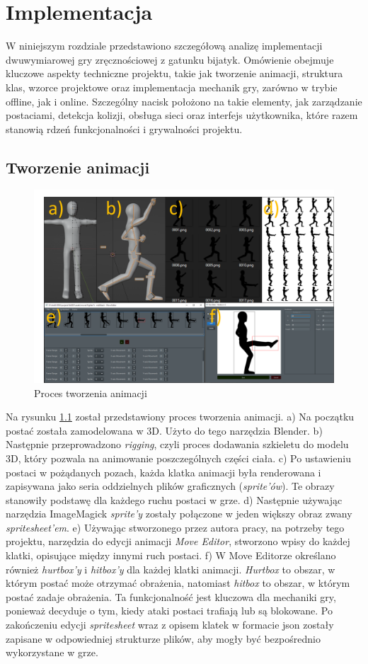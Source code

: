 \chapter{Implementacja}
W niniejszym rozdziale przedstawiono szczegółową analizę implementacji dwuwymiarowej gry zręcznościowej z gatunku bijatyk. Omówienie obejmuje kluczowe aspekty techniczne projektu, takie jak tworzenie animacji, struktura klas, wzorce projektowe oraz implementacja mechanik gry, zarówno w trybie offline, jak i online. Szczególny nacisk położono na takie elementy, jak zarządzanie postaciami, detekcja kolizji, obsługa sieci oraz interfejs użytkownika, które razem stanowią rdzeń funkcjonalności i grywalności projektu.
\section{Tworzenie animacji}
\begin{figure}
	\centering
		\includegraphics[width=0.64\linewidth]{rys03/animacja}
	\caption{Proces tworzenia animacji}
	\label{fig:animacja}
\end{figure}
Na rysunku \ref{fig:animacja} został przedstawiony proces tworzenia animacji. a) Na początku postać została zamodelowana w 3D. Użyto do tego narzędzia Blender. b) Następnie przeprowadzono \emph{rigging}, czyli proces dodawania szkieletu do modelu 3D, który pozwala na animowanie poszczególnych części ciała. c) Po ustawieniu postaci w pożądanych pozach, każda klatka animacji była renderowana i zapisywana jako seria oddzielnych plików graficznych (\emph{sprite'ów}). Te obrazy stanowiły podstawę dla każdego ruchu postaci w grze. d) Następnie używając narzędzia ImageMagick \emph{sprite'y} zostały połączone w jeden większy obraz zwany \emph{spritesheet'em}. e) Używając stworzonego przez autora pracy, na potrzeby tego projektu, narzędzia do edycji animacji \emph{Move Editor}, stworzono wpisy do każdej klatki, opisujące między innymi ruch postaci. f) W Move Editorze określano również \emph{hurtbox'y} i \emph{hitbox'y} dla każdej klatki animacji. \emph{Hurtbox} to obszar, w którym postać może otrzymać obrażenia, natomiast \emph{hitbox} to obszar, w którym postać zadaje obrażenia. Ta funkcjonalność jest kluczowa dla mechaniki gry, ponieważ decyduje o tym, kiedy ataki postaci trafiają lub są blokowane. Po zakończeniu edycji \emph{spritesheet} wraz z opisem klatek w formacie json zostały zapisane w odpowiedniej strukturze plików, aby mogły być bezpośrednio wykorzystane w grze.
